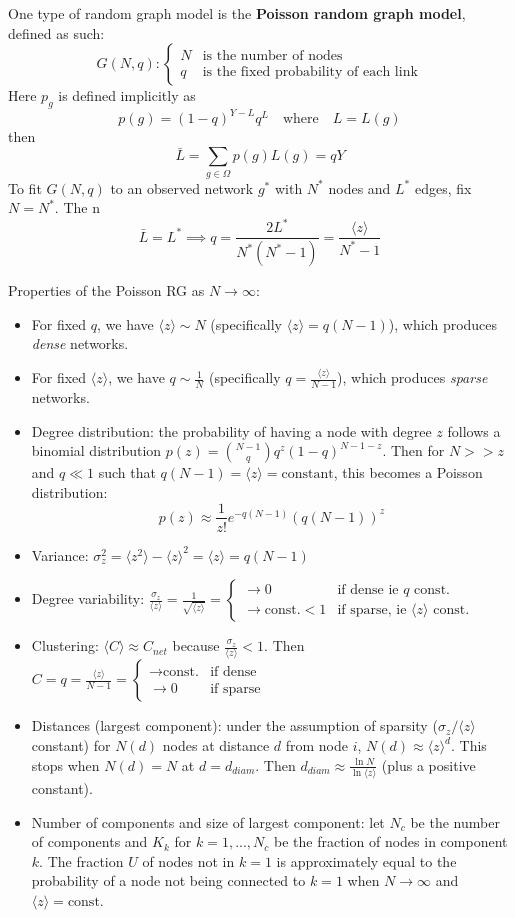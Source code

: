 \documentclass[12pt]{article}
\theoremstyle{definition}
\begin{document}
One type of random graph model is the \textbf{Poisson random graph model}, defined as such:
\[
G(N,q):
\begin{cases}
    N & \text{is the number of nodes} \\
    q & \text{is the fixed probability of each link}
\end{cases}
\]
Here $p_g$ is defined implicitly as
\[
p(g)=(1-q)^{Y-L}q^L \quad \text{where}\quad L=L(g)
\]
then
\[
\bar{L} = \sum_{g\in\Omega}p(g)L(g)=qY
\]
To fit $G(N,q)$ to an observed network $g^*$ with $N^*$ nodes and $L^*$ edges, fix $N=N^*$. The
n
\[
\bar{L}=L^*\implies q=\frac{2L^*}{N^*(N^*-1)} = \frac{\langle z\rangle}{N^*-1}
\]

Properties of the Poisson RG as $N\rightarrow\infty$: 
\begin{itemize}
    \item For fixed $q$, we have $\langle z\rangle \sim N$ (specifically $\langle z\rangle = q(N-1)$), which produces \textit{dense} networks. 
    \item For fixed $\langle z\rangle$, we have $q \sim \frac{1}{N}$ (specifically $q=\frac{\langle z\rangle}{N-1}$), which produces \textit{sparse} networks. 
    \item Degree distribution: the probability of having a node with degree $z$ follows a binomial distribution $p(z)=\binom{N-1}{q}q^z(1-q)^{N-1-z}$. Then for $N>>z$ and $q\ll 1$ such that $q(N-1)=\langle z\rangle=\text{constant}$, this becomes a Poisson distribution: 
    \[
    p(z)\approx\frac{1}{z!}e^{-q(N-1)}(q(N-1))^z
    \]
    \item Variance: $\sigma_z^2=\langle z^2\rangle - \langle z\rangle^2=\langle z\rangle = q(N-1)$
    \item Degree variability: $\frac{\sigma_z}{\langle z\rangle}=\frac{1}{\sqrt{\langle z\rangle}}=\begin{cases} \rightarrow 0 & \text{if dense ie $q$ const.} \\ \rightarrow \text{const.} < 1 & \text{if sparse, ie $\langle z\rangle$ const.}  \end{cases}$
    \item Clustering: $\langle C\rangle \approx C_{net}$ because $\frac{\sigma_z}{\langle z\rangle}<1$. Then $C=q=\frac{\langle z\rangle}{N-1}=\begin{cases} \rightarrow \text{const.} & \text{if dense} \\ \rightarrow 0 & \text{if sparse} \end{cases}$
    \item Distances (largest component): under the assumption of sparsity ($\sigma_z/\langle z\rangle$ constant) for $N(d)$ nodes at distance $d$ from node $i$, $N(d)\approx \langle z\rangle^d$. This stops when $N(d)=N$ at $d=d_{diam}$. Then $d_{diam}\approx\frac{\ln N}{\ln \langle z\rangle}$ (plus a positive constant). 
    \item Number of components and size of largest component: let $N_c$ be the number of components and $K_k$ for $k=1,...,N_c$ be the fraction of nodes in component $k$. The fraction $U$ of nodes not in $k=1$ is approximately equal to the probability of a node not being connected to $k=1$ when $N\rightarrow\infty$ and $\langle z\rangle=\text{const.}$ 


\end{itemize}
\end{document}
